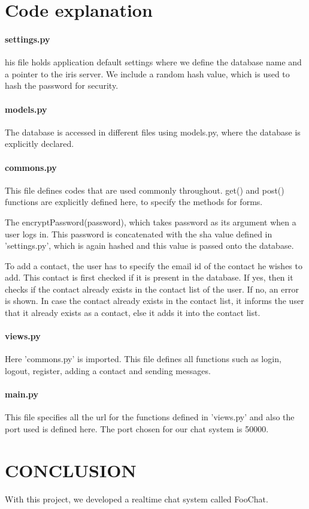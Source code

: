 \documentclass[a4paper,11pt,conference]{IEEEtran}
\begin{document}
\section{Code explanation}

\paragraph{settings.py}
his file holds application default settings where we define the database name and a pointer to the iris server. We include a random hash value, which is used to hash the password  for security. 
\paragraph{models.py}
The database is accessed in different files using models.py, where the database is explicitly declared.
\paragraph{commons.py}
This file defines codes that are used commonly throughout. get() and post() functions are explicitly defined here, to specify the methods for forms. 

The encryptPassword(password), which takes password as its argument when a user logs in. This password is concatenated with the sha value defined in 'settings.py', which is again hashed and this value is passed onto the database.

To add a contact, the user has to specify the email id of the contact he wishes to add. This contact is first checked if it is present in the database. If yes, then it checks if the contact already exists in the contact list of the user. If no, an error is shown. In case the contact already exists in the contact list, it informs the user that it already exists as a contact, else it adds it into the contact list.
\paragraph{views.py}
Here 'commons.py' is imported. This file defines all functions such as login, logout, register, adding a contact and sending messages. 
\paragraph{main.py}
This file specifies all the url for the functions defined in 'views.py' and also the port used is defined here. The port chosen for our chat system is 50000.


\section{CONCLUSION}
With this project, we developed a realtime chat system called FooChat.
\end{document}
